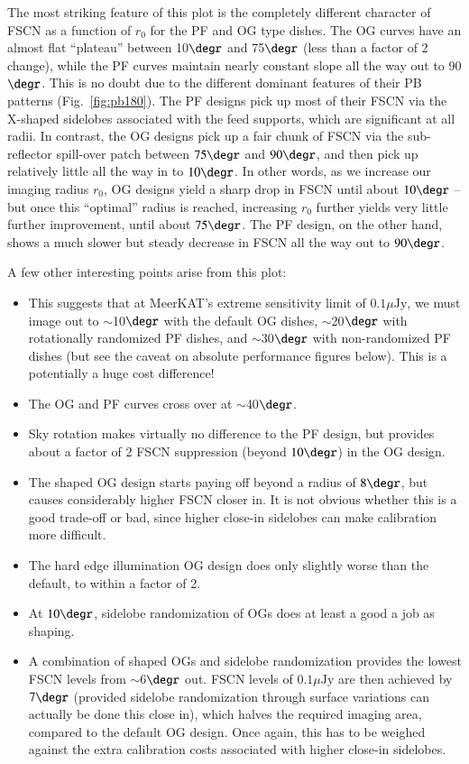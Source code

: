 \documentclass{aa}
\begin{document}
The most striking feature of this plot is the completely different character of FSCN as a function of $r_0$ for the PF and OG type dishes. The OG curves have an almost flat ``plateau'' between 10$\degr$ and 75$\degr$ (less than a factor of 2 change), while the PF curves maintain nearly constant slope all the way out to 90$\degr$. This is no doubt due to the different dominant features of their PB patterns (Fig.~\ref{fig:pb180}). The PF designs pick up most of their FSCN via the X-shaped sidelobes associated with the feed supports, which are significant at all radii. In contrast, the OG designs pick up a fair chunk of FSCN via the sub-reflector spill-over patch between $75\degr$ and $90\degr$, and then pick up relatively little all the way in to $10\degr$. In other words, as we increase our imaging radius $r_0$, OG designs yield a sharp drop in FSCN until about $10\degr$ -- but once this ``optimal'' radius is reached, increasing $r_0$ further yields very little further improvement, until about $75\degr$. The PF design, on the other hand, shows a much slower but steady decrease in FSCN all the way out to $90\degr$.

A few other interesting points arise from this plot:

\begin{itemize}
  \item This suggests that at MeerKAT's extreme sensitivity limit of $0.1 \mu\mathrm{Jy}$, we must image out to $\sim$10$\degr$ with the default OG dishes, $\sim$20$\degr$ with rotationally randomized PF dishes, and $\sim$30$\degr$ with non-randomized PF dishes (but see the caveat on absolute performance figures below). This is a potentially a huge cost difference!
  \item The OG and PF curves cross over at $\sim$40$\degr$.
  \item Sky rotation makes virtually no difference to the PF design, but provides about a factor of 2 FSCN suppression (beyond $10\degr$) in the OG design.
  \item The shaped OG design starts paying off beyond a radius of $8\degr$, but causes considerably higher FSCN closer in. It is not obvious whether this is a good trade-off or bad, since higher close-in sidelobes can make calibration more difficult.
  \item The hard edge illumination OG design does only slightly worse than the default, to within a factor of 2.
  \item At $10\degr$, sidelobe randomization of OGs does at least a good a job as shaping.
  \item A combination of shaped OGs and sidelobe randomization provides the lowest FSCN levels from $\sim$6$\degr$ out.
  FSCN levels of $0.1 \mu\mathrm{Jy}$ are then achieved by $7\degr$ (provided sidelobe randomization through surface variations can actually be done this close in), which halves the required imaging area, compared to the default OG design. Once again, this has to be weighed against the extra calibration costs associated with higher close-in sidelobes.
\end{itemize}
\end{document}
